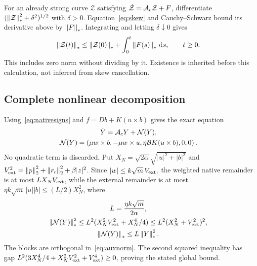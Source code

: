 For an already strong curve $\mathcal Z$ satisfying
$\dot{\mathcal Z}=\mathcal A_c\mathcal Z+F$, differentiate
$(\left\|\mathcal Z\right\|_*^2+\delta^2)^{1/2}$ with $\delta>0$.
Equation~\eqref{eq:skew} and Cauchy--Schwarz bound its derivative above by $\left\|F\right\|_*$. Integrating and letting $\delta\downarrow0$ gives
\begin{equation}\label{eq:forced}%
 \norm{\mathcal Z(t)}_*
 \le\norm{\mathcal Z(0)}_*+\int_0^t\norm{F(s)}_*\dd s,\qquad t\ge0 .
\end{equation}
This includes zero norm without dividing by it. Existence is inherited before this calculation, not inferred from skew cancellation.

\subsection{Complete nonlinear decomposition}\label{sec:nonlinear}
Using~\eqref{eq:nativesigns} and $f=Db+K(u\times b)$ gives the exact equation
\begin{equation}\label{eq:remainder}%
\begin{gathered}
 \dot Y=\Ac Y+\mathcal N(Y),\\
 \mathcal N(Y)=\left(
 \mu w\times b,-\mu w\times u,\eta\B K(u\times b),0,0
 \right).
\end{gathered}
\end{equation}
No quadratic term is discarded. Put
$X_N=\sqrt{2\alpha}\sqrt{|u|^2+|b|^2}$ and
$V_{\rm ext}^2=\left\|p\right\|_2^2+\left\|r_c\right\|_2^2+\beta|z|^2$.
Since $|w|\le k\sqrt m\,V_{\rm ext}$, the weighted native remainder is at most $LX_NV_{\rm ext}$, while the external remainder is at most
$\eta k\sqrt m\,|u||b|\le(L/2)X_N^2$, where
\begin{equation}\label{eq:nonlinearbound}%
\begin{gathered}
 L=\frac{\eta k\sqrt m}{2\alpha},\\
 \norm{\mathcal N(Y)}_*^2
 \le L^2(X_N^2V_{\rm ext}^2+X_N^4/4)
 \le L^2(X_N^2+V_{\rm ext}^2)^2,\\
 \norm{\mathcal N(Y)}_*\le L\norm Y_*^2 .
\end{gathered}
\end{equation}
The blocks are orthogonal in~\eqref{eq:auxnorm}. The second squared inequality has gap
$L^2(3X_N^4/4+X_N^2V_{\rm ext}^2+V_{\rm ext}^4)\ge0$, proving the stated global bound.
